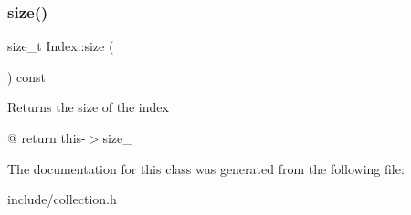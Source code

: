 \subsubsection{\texorpdfstring{size()}{size()}}
{\footnotesize\ttfamily size\+\_\+t Index\+::size (\begin{DoxyParamCaption}{ }\end{DoxyParamCaption}) const}

Returns the size of the index

@ return this-\/$>$size\+\_\+ 

The documentation for this class was generated from the following file\+:\begin{DoxyCompactItemize}
\item 
include/collection.\+h\end{DoxyCompactItemize}
